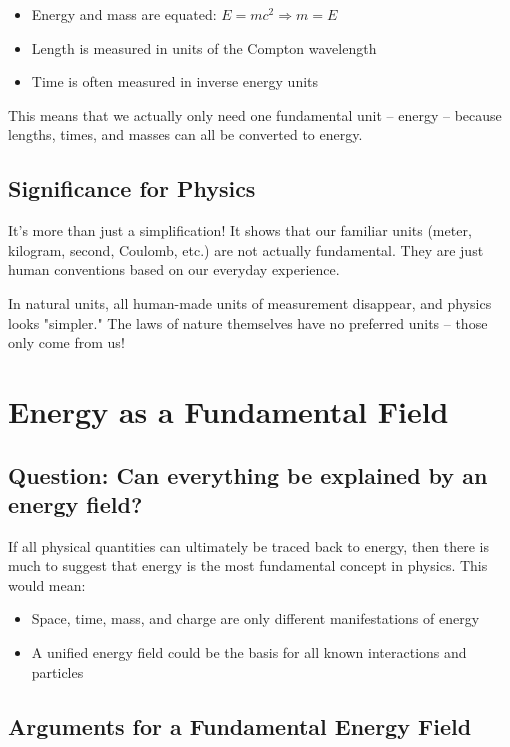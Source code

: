 \documentclass{article}
\begin{document}
\begin{itemize}
	\item Energy and mass are equated: $E = mc^2 \Rightarrow m = E$
	\item Length is measured in units of the Compton wavelength
	\item Time is often measured in inverse energy units
\end{itemize}

This means that we actually only need one fundamental unit – energy – because lengths, times, and masses can all be converted to energy.

\subsection{Significance for Physics}
It's more than just a simplification! It shows that our familiar units (meter, kilogram, second, Coulomb, etc.) are not actually fundamental. They are just human conventions based on our everyday experience.

In natural units, all human-made units of measurement disappear, and physics looks "simpler." The laws of nature themselves have no preferred units – those only come from us!

\section{Energy as a Fundamental Field}

\subsection{Question: Can everything be explained by an energy field?}

If all physical quantities can ultimately be traced back to energy, then there is much to suggest that energy is the most fundamental concept in physics. This would mean:

\begin{itemize}
	\item Space, time, mass, and charge are only different manifestations of energy
	\item A unified energy field could be the basis for all known interactions and particles
\end{itemize}

\subsection{Arguments for a Fundamental Energy Field}
\end{document}
